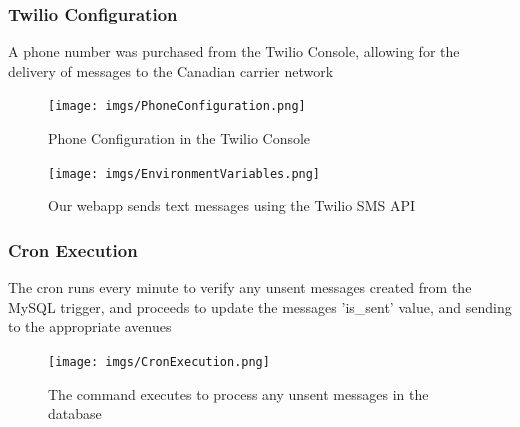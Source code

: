 \documentclass{article}
\begin{document}
\subsubsection{Twilio Configuration}

A phone number was purchased from the Twilio Console, allowing for the delivery of messages to the Canadian carrier network

\begin{figure}[h]
    \centering
    \texttt{[image: imgs/PhoneConfiguration.png]}
    \caption{Phone Configuration in the Twilio Console}
\end{figure}

\begin{figure}[h]
    \centering
    \texttt{[image: imgs/EnvironmentVariables.png]}
    \caption{Our webapp sends text messages using the Twilio SMS API}
\end{figure}
\subsubsection{Cron Execution}

The cron runs every minute to verify any unsent messages created from the MySQL trigger, and proceeds to update the messages 'is\_sent' value, and sending to the appropriate avenues

\begin{figure}[h]
    \centering
    \texttt{[image: imgs/CronExecution.png]}
    \caption{The command executes to process any unsent messages in the database}
\end{figure}
\end{document}
